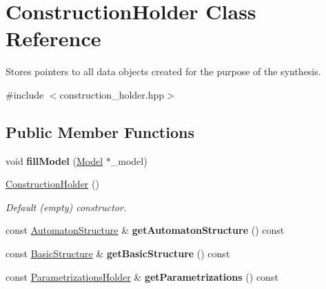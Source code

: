 \hypertarget{classConstructionHolder}{\section{\-Construction\-Holder \-Class \-Reference}
\label{classConstructionHolder}
}


\-Stores pointers to all data objects created for the purpose of the synthesis.  




{\ttfamily \#include $<$construction\-\_\-holder.\-hpp$>$}

\subsection*{\-Public \-Member \-Functions}
\begin{DoxyCompactItemize}
\item 
\hypertarget{classConstructionHolder_ad3908d8aca87544bbb71b249c7c0447c}{void {\bfseries fill\-Model} (\hyperlink{classModel}{\-Model} $\ast$\-\_\-model)}\label{classConstructionHolder_ad3908d8aca87544bbb71b249c7c0447c}

\item 
\hypertarget{classConstructionHolder_a66bb9b904227fb8536768709133805d2}{\hyperlink{classConstructionHolder_a66bb9b904227fb8536768709133805d2}{\-Construction\-Holder} ()}\label{classConstructionHolder_a66bb9b904227fb8536768709133805d2}

\begin{DoxyCompactList}\small\item\em \-Default (empty) constructor. \end{DoxyCompactList}\item 
\hypertarget{classConstructionHolder_a5a3592d6282378279b18125c3c5a18a3}{const \hyperlink{classAutomatonStructure}{\-Automaton\-Structure} \& {\bfseries get\-Automaton\-Structure} () const }\label{classConstructionHolder_a5a3592d6282378279b18125c3c5a18a3}

\item 
\hypertarget{classConstructionHolder_a19724cabc63253f559fdfadc55e00d2f}{const \hyperlink{classBasicStructure}{\-Basic\-Structure} \& {\bfseries get\-Basic\-Structure} () const }\label{classConstructionHolder_a19724cabc63253f559fdfadc55e00d2f}

\item 
\hypertarget{classConstructionHolder_a8cc460f71c8aa32f8b611b6b6d6d135f}{const \hyperlink{classParametrizationsHolder}{\-Parametrizations\-Holder} \& {\bfseries get\-Parametrizations} () const }\label{classConstructionHolder_a8cc460f71c8aa32f8b611b6b6d6d135f}


\end{DoxyCompactItemize}
